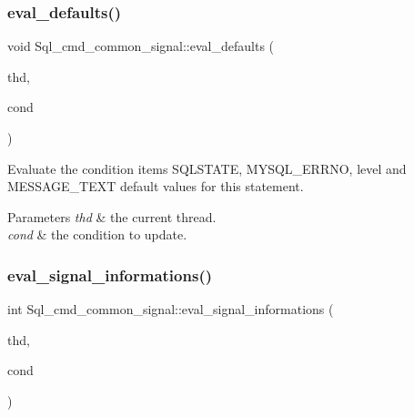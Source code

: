\subsubsection{\texorpdfstring{eval\+\_\+defaults()}{eval\_defaults()}}
{\footnotesize\ttfamily void Sql\+\_\+cmd\+\_\+common\+\_\+signal\+::eval\+\_\+defaults (\begin{DoxyParamCaption}\item[{T\+HD $\ast$}]{thd,  }\item[{\mbox{\hyperlink{classSql__condition}{Sql\+\_\+condition}} $\ast$}]{cond }\end{DoxyParamCaption})\hspace{0.3cm}{\ttfamily [protected]}}

Evaluate the condition items \textquotesingle{}S\+Q\+L\+S\+T\+A\+TE\textquotesingle{}, \textquotesingle{}M\+Y\+S\+Q\+L\+\_\+\+E\+R\+R\+NO\textquotesingle{}, \textquotesingle{}level\textquotesingle{} and \textquotesingle{}M\+E\+S\+S\+A\+G\+E\+\_\+\+T\+E\+XT\textquotesingle{} default values for this statement. 
\begin{DoxyParams}{Parameters}
{\em thd} & the current thread. \\
\hline
{\em cond} & the condition to update. \\
\hline
\end{DoxyParams}
\mbox{\label{classSql__cmd__common__signal_a6994c11527b7284868e9bed5c3783d7e}} 
\subsubsection{\texorpdfstring{eval\+\_\+signal\+\_\+informations()}{eval\_signal\_informations()}}
{\footnotesize\ttfamily int Sql\+\_\+cmd\+\_\+common\+\_\+signal\+::eval\+\_\+signal\+\_\+informations (\begin{DoxyParamCaption}\item[{T\+HD $\ast$}]{thd,  }\item[{\mbox{\hyperlink{classSql__condition}{Sql\+\_\+condition}} $\ast$}]{cond }\end{DoxyParamCaption})\hspace{0.3cm}{\ttfamily [protected]}}

